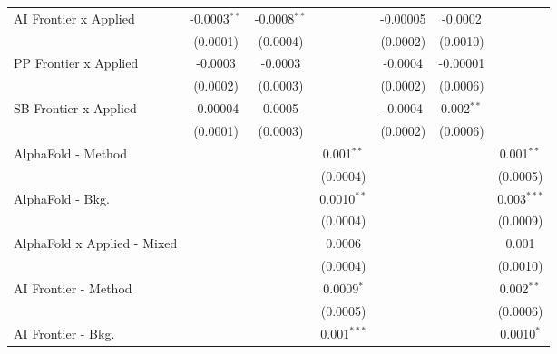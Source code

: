 \begin{tabular}{lcccccc}
   AI Frontier x Applied          & -0.0003$^{**}$  & -0.0008$^{**}$ &                & -0.00005        & -0.0002        &   \\   
                                  & (0.0001)        & (0.0004)       &                & (0.0002)        & (0.0010)       &   \\   
   PP Frontier x Applied          & -0.0003         & -0.0003        &                & -0.0004         & -0.00001       &   \\   
                                  & (0.0002)        & (0.0003)       &                & (0.0002)        & (0.0006)       &   \\   
   SB Frontier x Applied          & -0.00004        & 0.0005         &                & -0.0004         & 0.002$^{**}$   &   \\   
                                  & (0.0001)        & (0.0003)       &                & (0.0002)        & (0.0006)       &   \\   
   AlphaFold - Method             &                 &                & 0.001$^{**}$   &                 &                & 0.001$^{**}$\\   
                                  &                 &                & (0.0004)       &                 &                & (0.0005)\\   
   AlphaFold - Bkg.               &                 &                & 0.0010$^{**}$  &                 &                & 0.003$^{***}$\\   
                                  &                 &                & (0.0004)       &                 &                & (0.0009)\\   
   AlphaFold x Applied - Mixed    &                 &                & 0.0006         &                 &                & 0.001\\   
                                  &                 &                & (0.0004)       &                 &                & (0.0010)\\   
   AI Frontier - Method           &                 &                & 0.0009$^{*}$   &                 &                & 0.002$^{**}$\\   
                                  &                 &                & (0.0005)       &                 &                & (0.0006)\\   
   AI Frontier - Bkg.             &                 &                & 0.001$^{***}$  &                 &                & 0.0010$^{*}$\\   

\end{tabular}
